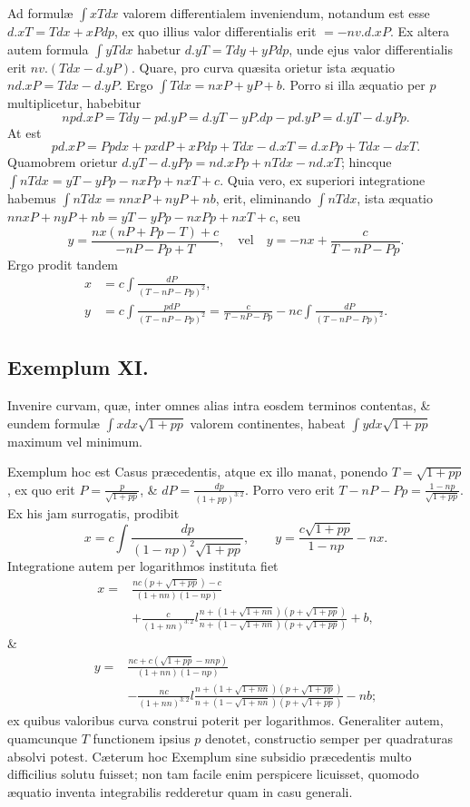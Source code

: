 Ad formulæ $\int xTdx$ valorem differentialem inveniendum, notandum est esse $d.xT=Tdx+xPdp$, ex quo illius valor differentialis erit $=-nv.d.xP$. Ex altera autem formula $\int yTdx$ habetur $d.yT=Tdy+yPdp$, unde ejus valor differentialis erit $nv.(Tdx-d.yP)$. Quare, pro curva quæsita orietur ista æquatio $nd.xP=Tdx-d.yP$. Ergo $\int Tdx=nxP+yP+b$. Porro si illa æquatio per $p$ multiplicetur, habebitur
\[npd.xP=Tdy-pd.yP=d.yT-yP.dp-pd.yP=d.yT-d.yPp.\]
At est
\[pd.xP=Ppdx+pxdP+xPdp+Tdx-d.xT=d.xPp+Tdx-dxT.\]
Quamobrem orietur $d.yT-d.yPp=nd.xPp+nTdx-nd.xT$; hincque $\int nTdx=yT-yPp-nxPp+nxT+c$. Quia vero, ex superiori integratione habemus $\int nTdx=nnxP+nyP+nb$, erit, eliminando $\int nTdx$, ista æquatio $nnxP+nyP+nb=yT-yPp-nxPp+nxT+c$, seu
\[y=\frac{nx(nP+Pp-T)+c}{-nP-Pp+T},\quad\text{vel}\quad y=-nx+\frac c{T-nP-Pp}.\]
Ergo prodit tandem
\[
\begin{aligned}
x&=c\int\frac{dP}{(T-nP-Pp)^2},\\
y&=c\int\frac{pdP}{(T-nP-Pp)^2}=\frac c{T-nP-Pp}-nc\int\frac{dP}{(T-nP-Pp)^2}.
\end{aligned}
\]

\subsection*{Exemplum XI.}
Invenire curvam, quæ, inter omnes alias intra eosdem terminos contentas, \& eundem formulæ $\int xdx\sqrt{1+pp}$ valorem continentes, habeat $\int ydx\sqrt{1+pp}$ maximum vel minimum.

Exemplum hoc est Casus præcedentis, atque ex illo manat, ponendo $T=\sqrt{1+pp}$, ex quo erit $P=\frac p{\sqrt{1+pp}}$, \& $dP=\frac{dp}{(1+pp)^{3:2}}$. Porro vero erit $T-nP-Pp=\frac{1-np}{\sqrt{1+pp}}$. Ex his jam surrogatis, prodibit
\[x=c\int\frac{dp}{(1-np)^2\sqrt{1+pp}},\qquad y=\frac{c\sqrt{1+pp}}{1-np}-nx.\]
Integratione autem per logarithmos instituta fiet
\[
\begin{aligned}
x={}&\frac{nc(p+\sqrt{1+pp})-c}{(1+nn)(1-np)}\\
&+\frac c{(1+nn)^{3:2}}l\frac{n+(1+\sqrt{1+nn})(p+\sqrt{1+pp})}{n+(1-\sqrt{1+nn})(p+\sqrt{1+pp})}+b,
\end{aligned}
\]
\&
\[
\begin{aligned}
y={}&\frac{nc+c(\sqrt{1+pp}-nnp)}{(1+nn)(1-np)}\\
&-\frac{nc}{(1+nn)^{3:2}}l\frac{n+(1+\sqrt{1+nn})(p+\sqrt{1+pp})}{n+(1-\sqrt{1+nn})(p+\sqrt{1+pp})}-nb;
\end{aligned}
\]
ex quibus valoribus curva construi poterit per logarithmos. Generaliter autem, quamcunque $T$ functionem ipsius $p$ denotet, constructio semper per quadraturas absolvi potest. Cæterum hoc Exemplum sine subsidio præcedentis multo difficilius solutu fuisset; non tam facile enim perspicere licuisset, quomodo æquatio inventa integrabilis redderetur quam in casu generali.

